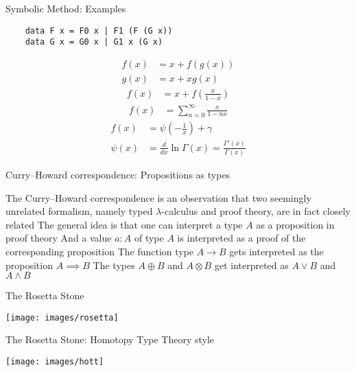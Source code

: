 \documentclass[pdf]{beamer}
\begin{document}
\begin{frame}[fragile]{Symbolic Method: Examples}
  \begin{verbatim}
    data F x = F0 x | F1 (F (G x))
    data G x = G0 x | G1 x (G x)
  \end{verbatim}
  \pause
  \begin{align*}
    f(x) &= x + f(g(x)) \\
    g(x) &= x + x g(x)
  \end{align*}
  \pause
  \begin{align*}
    f(x) &= x + f(\frac{x}{1-x})
  \end{align*}
  \pause
  \begin{align*}
    f(x) &= \sum_{n=0}^{\infty} \frac{x}{1-n x}
  \end{align*}
  \pause
  \begin{align*}
    f(x) &= \psi(-\frac{1}{x}) + \gamma \\
    \psi(x) &= \frac{d}{dx}\ln\Gamma(x) = \frac{\Gamma'(x)}{\Gamma(x)}
  \end{align*}
\end{frame}

\begin{frame}{Curry–Howard correspondence: Propositions as types}
  \begin{outline}
    \1 The Curry–Howard correspondence is an observation that two seemingly unrelated formalism, namely typed $\lambda$-calculus and proof theory, are in fact closely related
    \pause
    \1 The general idea is that one can interpret a type $A$ as a proposition in proof theory
    \pause
    \1 And a value $a : A$ of type $A$ is interpreted as a proof of the corresponding proposition
    \pause
    \1 The function type $A \to B$ gets interpreted as the proposition $A \implies B$
    \pause
    \1 The types $A \oplus B$ and $A \otimes B$ get interpreted as $A \lor B$ and $A \land B$
  \end{outline}
\end{frame}

\begin{frame}{The Rosetta Stone}
  \begin{center}
    \texttt{[image: images/rosetta]}
  \end{center}
\end{frame}

\begin{frame}{The Rosetta Stone: Homotopy Type Theory style}
  \begin{center}
    \texttt{[image: images/hott]}
  \end{center}
\end{frame}
\end{document}
